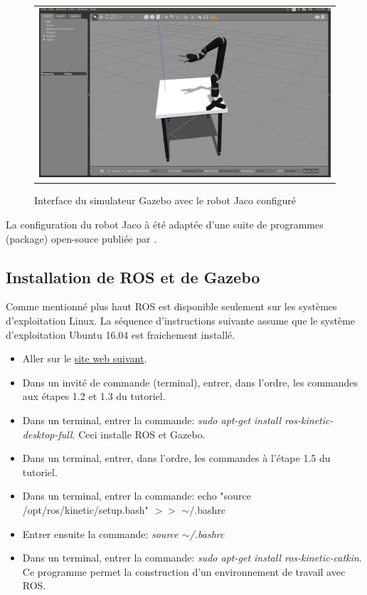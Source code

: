 \documentclass[root.tex]{subfiles}
\begin{document}
\begin{figure}
 \begin{center}
  \begin{tabular}{c}
    \includegraphics[trim=0cm 0cm 0cm 0cm, scale=0.25]{gazebo_jaco.png}
  \end{tabular}
 \end{center}
\caption{Interface du simulateur Gazebo avec le robot Jaco configuré}
 \label{fig:gazebo_jaco}
\end{figure}

La configuration du robot Jaco à été adaptée d'une suite de programmes (package) open-souce publiée par \cite{jaco_github}.

\subsection{Installation de ROS et de Gazebo}

Comme mentionné plus haut ROS est disponible seulement sur les systèmes d'exploitation Linux.
La séquence d'instructions suivante assume que le système d'exploitation Ubuntu 16.04 est fraichement installé.

\begin{itemize}
\item Aller sur le \href{http://wiki.ros.org/kinetic/Installation/Ubuntu}{site web suivant}.
\item Dans un invité de commande (terminal), entrer, dans l'ordre, les commandes aux étapes 1.2 et 1.3 du tutoriel.
\item Dans un terminal, entrer la commande: \textit{sudo apt-get install ros-kinetic-desktop-full}. Ceci installe ROS et Gazebo.
\item Dans un terminal, entrer, dans l'ordre, les commandes à l'étape 1.5 du tutoriel.
\item Dans un terminal, entrer la commande: echo "source /opt/ros/kinetic/setup.bash" $>>$ $\sim$/.bashrc
\item Entrer ensuite la commande: \textit{source $\sim$/.bashrc}
\item Dans un terminal, entrer la commande: \textit{sudo apt-get install ros-kinetic-catkin}. Ce programme permet la construction d'un environnement de travail avec ROS.
\end{itemize}







\newpage
\end{document}

